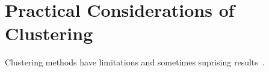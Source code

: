 \newcommand{\clusterlimitpath}{\thischapterpath}

\chapter{Practical Considerations of Clustering}
\label{ch:clusterlimit}

Clustering methods have limitations and sometimes suprising
results~\cite{James2013IntroductiontoStatistical}.
